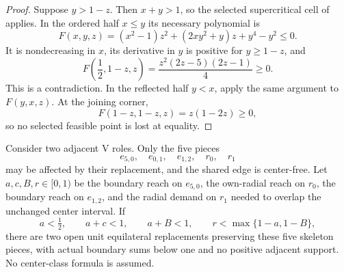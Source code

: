 \begin{proof}
Suppose \(y>1-z\).  Then \(x+y>1\), so the selected supercritical cell of
 applies.  In the ordered half \(x\le y\)
its necessary polynomial is
\[
 F(x,y,z)=
 (x^2-1)z^2+(2xy^2+y)z+y^4-y^2\le0.
\]
It is nondecreasing in \(x\), its derivative in \(y\) is positive for
\(y\ge1-z\), and
\[
 F\left(\frac12,1-z,z\right)
 =\frac{z^2(2z-5)(2z-1)}4\ge0.
\]
This is a contradiction.  In the reflected half \(y<x\), apply the same
argument to \(F(y,x,z)\).  At the joining corner,
\[
 F(1-z,1-z,z)=z(1-2z)\ge0,
\]
so no selected feasible point is lost at equality.
\end{proof}

\begin{lemma}
\label{lem:two-vertex-replacement}
Consider two adjacent V roles. Only the five pieces
\[
 e_{5,0},\quad e_{0,1},\quad e_{1,2},\quad r_0,\quad r_1
\]
may be affected by their replacement, and the shared edge is center-free.
Let $a,c,B,r\in[0,1)$ be the boundary reach on $e_{5,0}$, the own-radial
reach on $r_0$, the boundary reach on $e_{1,2}$, and the radial demand
on $r_1$ needed to overlap the unchanged center interval. If
\[
 a<\tfrac12,\qquad a+c<1,\qquad a+B<1,\qquad
 r<\max\{1-a,1-B\},
\]
there are two open unit equilateral replacements preserving these five
skeleton pieces, with actual boundary sums below one and no positive
adjacent support. No center-class formula is assumed.
\end{lemma}
